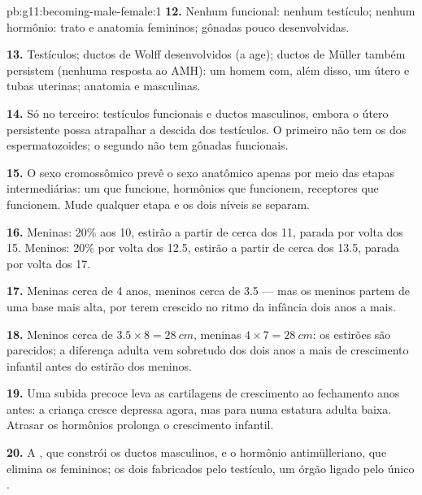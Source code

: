 \begin{solution}{pb:g11:becoming-male-female:1}
\textbf{12.} Nenhum  funcional: nenhum testículo; nenhum hormônio:
trato e anatomia femininos; gônadas pouco desenvolvidas.

\textbf{13.} Testículos; ductos de Wolff desenvolvidos (a 
age); ductos de Müller também persistem (nenhuma resposta ao AMH): um
homem com, além disso, um útero e tubas uterinas; anatomia e 
masculinas.

\textbf{14.} Só no terceiro: testículos funcionais e ductos masculinos,
embora o útero persistente possa atrapalhar a descida dos testículos. O
primeiro não tem os  dos espermatozoides; o segundo não tem
gônadas funcionais.

\textbf{15.} O sexo cromossômico prevê o sexo anatômico apenas por
meio das etapas intermediárias: um  que funcione, hormônios que
funcionem, receptores que funcionem. Mude qualquer etapa e os dois
níveis se separam.

\textbf{16.} Meninas: 20\% aos 10, estirão a partir de cerca dos 11,
parada por volta dos 15. Meninos: 20\% por volta dos 12.5, estirão a
partir de cerca dos 13.5, parada por volta dos 17.

\textbf{17.} Meninas cerca de 4 anos, meninos cerca de 3.5 --- mas os
meninos partem de uma base mais alta, por terem crescido no ritmo da
infância dois anos a mais.

\textbf{18.} Meninos cerca de $3.5 \times 8 = \qty{28}{cm}$, meninas $4 \times
7 = \qty{28}{cm}$: os estirões são parecidos; a diferença adulta vem
sobretudo dos dois anos a mais de crescimento infantil antes do estirão
dos meninos.

\textbf{19.} Uma subida precoce leva as cartilagens de crescimento ao
fechamento anos antes: a criança cresce depressa agora, mas para numa
estatura adulta baixa. Atrasar os hormônios prolonga o crescimento
infantil.

\textbf{20.} A , que constrói os ductos masculinos, e o
hormônio antimülleriano, que elimina os femininos; os dois fabricados
pelo testículo, um órgão ligado pelo  único .
\end{solution}
